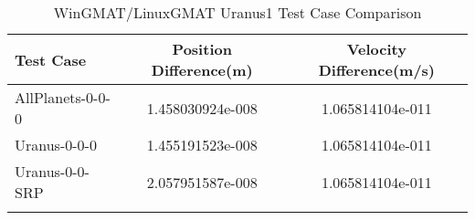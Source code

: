 \begin{table}[htbp!]
\centering
\caption{ WinGMAT/LinuxGMAT Uranus1 Test Case Comparison}
      \begin{tabular}{lcc}
      \hline\hline
          Test Case & Position Difference(m) & Velocity Difference(m/s) \\
         \hline
         AllPlanets-0-0-0 & 1.458030924e-008 & 1.065814104e-011 \\
         Uranus-0-0-0 & 1.455191523e-008 & 1.065814104e-011 \\
         Uranus-0-0-SRP & 2.057951587e-008 & 1.065814104e-011 \\
      \hline\hline
      \label{Table: Uranus1 WinGMAT-LinuxGMAT Table} 
\end{tabular}
\end{table}
